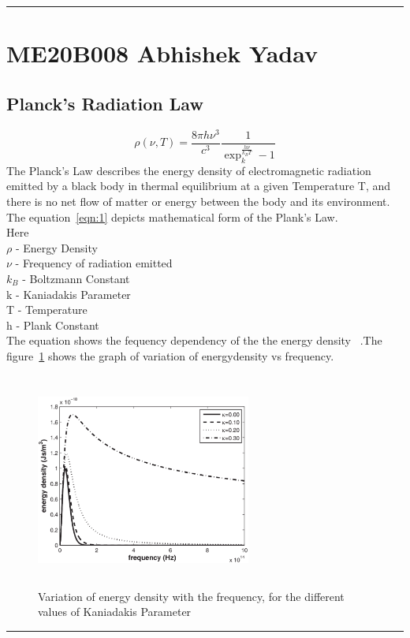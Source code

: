 
\hrule
\section{ME20B008 Abhishek Yadav}
\subsection{Planck's Radiation Law}
\begin{equation}
	\rho(\nu,T)={\frac{8 \pi h \nu^3}{c^3}}  {\frac{1}{\exp_k^{\frac{h \nu}{k_BT}} - 1}}
	\label{eqn:1}
\end{equation}
The Planck's Law describes the energy density of electromagnetic radiation emitted by a black body in thermal equilibrium at a given Temperature T, and there is no net flow of matter or energy between the body and its environment.
The equation~\ref{eqn:1} depicts mathematical form of the Plank's Law. \\
Here \\
$\rho$ - Energy Density \\
$\nu$  - Frequency of radiation emitted \\
$k_B$  -  Boltzmann Constant \\
k      -  Kaniadakis Parameter \\
T      - Temperature \\
h      - Plank Constant \\
The equation shows the fequency dependency of the the energy density ~\cite{meb008}.The figure~\ref{fig:me20b008} shows the graph of variation of energydensity vs frequency.
\begin{figure}[h]
        \begin{center}
		\includegraphics[width=200pt,height=200pt]{me20b008.eps}
		\end{center}
        \caption{Variation of energy density with the frequency, for the different values of Kaniadakis Parameter}
        \label{fig:me20b008}
\end{figure}
\hrule


